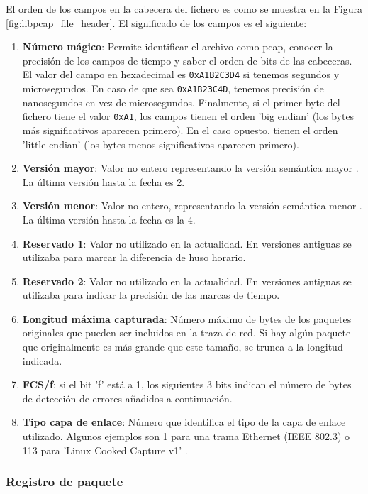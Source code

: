 El orden de los campos en la cabecera del fichero es como se muestra en la Figura \ref{fig:libpcap_file_header}. El significado de los campos es el siguiente:

\begin{enumerate}
    \item \textbf{Número mágico}: Permite identificar el archivo como pcap, conocer la precisión de los campos de tiempo y saber el orden de bits de las cabeceras. El valor del campo en hexadecimal es \texttt{0xA1B2C3D4} si tenemos segundos y microsegundos. En caso de que sea \texttt{0xA1B23C4D}, tenemos precisión de nanosegundos en vez de microsegundos. Finalmente, si el primer byte del fichero tiene el valor \texttt{0xA1}, los campos tienen el orden 'big endian' (los bytes más significativos aparecen primero). En el caso opuesto, tienen el orden 'little endian' (los bytes menos significativos aparecen primero).
    \item \textbf{Versión mayor}: Valor no entero representando la versión semántica mayor \cite{preston2013semantic}. La última versión hasta la fecha es 2.
    \item \textbf{Versión menor}: Valor no entero, representando la versión semántica menor \cite{preston2013semantic}. La última versión hasta la fecha es la 4.
    \item \textbf{Reservado 1}: Valor no utilizado en la actualidad. En versiones antiguas se utilizaba para marcar la diferencia de huso horario.
    \item \textbf{Reservado 2}: Valor no utilizado en la actualidad. En versiones antiguas se utilizaba para indicar la precisión de las marcas de tiempo.
    \item \textbf{Longitud máxima capturada}: Número máximo de bytes de los paquetes originales que pueden ser incluidos en la traza de red. Si hay algún paquete que originalmente es más grande que este tamaño, se trunca a la longitud indicada.    \item \textbf{FCS/f}: si el bit 'f' está a 1, los siguientes 3 bits indican el número de bytes de detección de errores añadidos a continuación. 
    \item \textbf{Tipo capa de enlace}: Número que identifica el tipo de la capa de enlace utilizado. Algunos ejemplos son 1 para una trama Ethernet (IEEE 802.3) o 113 para 'Linux Cooked Capture v1' \cite{linktypetcpdump}.
\end{enumerate}

\subsubsection{Registro de paquete}

